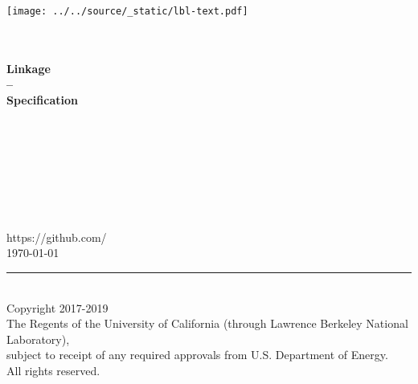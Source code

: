 \begin{titlepage}
\begin{minipage}{\headwidth}
\begin{flushright}
\texttt{[image: ../../source/\_static/lbl-text.pdf]}
\end{flushright}
\begin{flushright}
\vspace{-1cm}
\large{~}
\\[5mm]
\hrulefill
\\[5mm]
 \Large\sffamily\bfseries{Linkage}\\
 \Large\sffamily\bfseries{--}\\[3mm]
 \Large\sffamily\bfseries{Specification}\\
 \Large\sffamily\bfseries{~}
\\
\hrulefill
~\\[30mm]
\end{flushright}
\begin{center}
\large{~}\\
\large{~}\\
\large{~}\\
\large{~}\\
\large{~}\\
\large{https://github.com/}
~\\[30mm]
\large{\today}
\\[30mm]
\end{center}
\hrule
~\\[2mm]
\textcopyright Copyright 2017-2019\\
The Regents of the University of California
(through Lawrence Berkeley National Laboratory),\\
subject to receipt of any required approvals from U.S. Department of Energy.\\
All rights reserved.
\end{minipage}
\end{titlepage}
